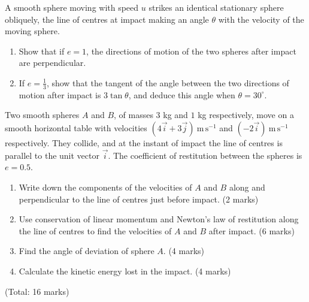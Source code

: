 \documentclass[11pt]{article}
\newcounter{popsec}
\newcounter{popsub}
\newcommand{\courssub}[1]{%
  \stepcounter{popsub}%
  \par\vspace{9pt}\noindent{\popxbold\fontsize{11.5}{13}\selectfont\color{popink}{\color{poporange}\thepopsec.\thepopsub}\hspace{6pt}#1}\par\nopagebreak\vspace{4pt}
}
\begin{document}
\begin{exercice}
A smooth sphere moving with speed $u$ strikes an identical stationary sphere obliquely, the line of centres at impact making an angle $\theta$ with the velocity of the moving sphere.
\begin{enumerate}
\item Show that if $e=1$, the directions of motion of the two spheres after impact are perpendicular.
\item If $e=\tfrac{1}{3}$, show that the tangent of the angle between the two directions of motion after impact is $3\tan\theta$, and deduce this angle when $\theta=30^{\circ}$.
\end{enumerate}
\end{exercice}

\courssub{I prepare for the GCE}

\begin{exercice}
Two smooth spheres $A$ and $B$, of masses $3$ kg and $1$ kg respectively, move on a smooth horizontal table with velocities $(4\vec{i}+3\vec{j})\ \mathrm{m\,s^{-1}}$ and $(-2\vec{i})\ \mathrm{m\,s^{-1}}$ respectively. They collide, and at the instant of impact the line of centres is parallel to the unit vector $\vec{i}$. The coefficient of restitution between the spheres is $e=0.5$.
\begin{enumerate}
\item Write down the components of the velocities of $A$ and $B$ along and perpendicular to the line of centres just before impact. \hfill(2 marks)
\item Use conservation of linear momentum and Newton's law of restitution along the line of centres to find the velocities of $A$ and $B$ after impact. \hfill(6 marks)
\item Find the angle of deviation of sphere $A$. \hfill(4 marks)
\item Calculate the kinetic energy lost in the impact. \hfill(4 marks)
\end{enumerate}
\hfill(Total: 16 marks)
\end{exercice}
\end{document}
